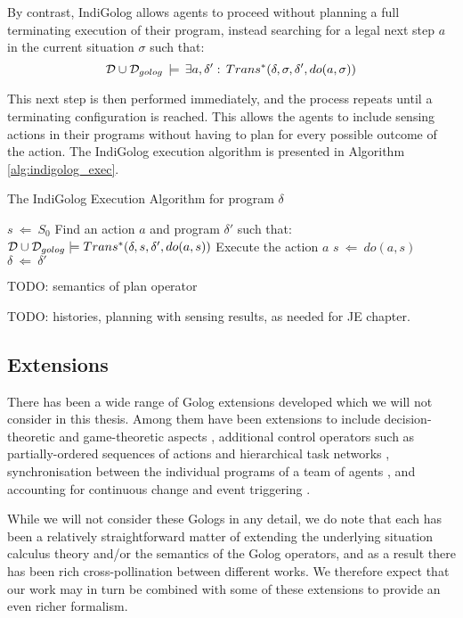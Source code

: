 By contrast, IndiGolog allows agents to proceed without planning a
full terminating execution of their program, instead searching for
a legal next step $a$ in the current situation $\sigma$ such that:\[
\mathcal{D}\cup\mathcal{D}_{golog}\,\models\,\exists a,\delta':\, Trans^{*}(\delta,\sigma,\delta',do(a,\sigma))\]


This next step is then performed immediately, and the process repeats
until a terminating configuration is reached. This allows the agents
to include sensing actions in their programs without having to plan
for every possible outcome of the action. The IndiGolog execution
algorithm is presented in Algorithm \ref{alg:indigolog_exec}.

%
\begin{algorithm}[t]
 

\caption{The IndiGolog Execution Algorithm for program $\delta$}


\label{alg:indigolog_exec} \begin{algorithmic} \STATE $s\ \Leftarrow\ S_{0}$
 \STATE
Find an action $a$ and program $\delta'$ such that: $\mathcal{D}\cup\mathcal{D}_{golog}\models Trans^{*}(\delta,s,\delta',do(a,s))$
\STATE Execute the action $a$ \STATE $s\ \Leftarrow\ do(a,s)$
\STATE $\delta\ \Leftarrow\ \delta'$ \ENDWHILE \end{algorithmic} 
\end{algorithm}


TODO: semantics of plan operator

TODO: histories, planning with sensing results, as needed for JE chapter.


\subsection{Extensions}

There has been a wide range of Golog extensions developed which we
will not consider in this thesis. Among them have been extensions
to include decision-theoretic \citep{boutilier00dtgolog} and game-theoretic
aspects \citep{finzi03gtgolog,finzi05pogtgolog}, additional control
operators such as partially-ordered sequences of actions \citep{son00htn_golog}
and hierarchical task networks \citep{Gabaldon02htn_in_golog,Son04golog+htn+time},
synchronisation between the individual programs of a team of agents
\citep{farinelli07team_golog}, and accounting for continuous change
and event triggering \citep{grosskreutz00ccgolog}.

While we will not consider these Gologs in any detail, we do note
that each has been a relatively straightforward matter of extending
the underlying situation calculus theory and/or the semantics of the
Golog operators, and as a result there has been rich cross-pollination
between different works. We therefore expect that our work may in
turn be combined with some of these extensions to provide an even
richer formalism.


